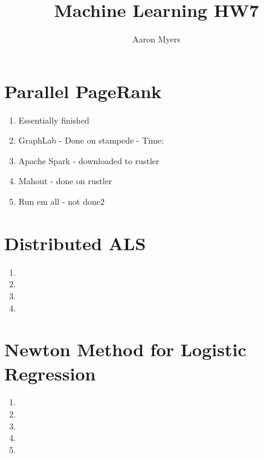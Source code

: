\documentclass[a4paper,10pt]{article}
\title{Machine Learning HW7}
\author{Aaron Myers}
\begin{document}
\maketitle
\section{Parallel PageRank}
\begin{enumerate}
	\item Essentially finished
	\item GraphLab - Done on stampede - Time: 
	\item Apache Spark - downloaded to rustler
	\item Mahout - done on rustler
	\item Run em all - not done2
\end{enumerate}

\section{Distributed ALS}
\begin{enumerate}
	\item
	\item
	\item
	\item
\end{enumerate}
\section{Newton Method for Logistic Regression}

\begin{enumerate}
	\item
	\item
	\item
	\item
	\item
\end{enumerate}
\end{document}

